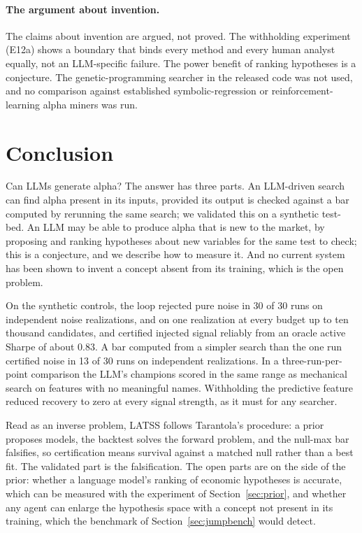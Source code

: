 \documentclass[11pt]{article}
\begin{document}
\paragraph{The argument about invention.} The claims about invention are argued, not proved. The
withholding experiment (E12a) shows a boundary that binds every method and every human analyst equally,
not an LLM-specific failure. The power benefit of ranking hypotheses is a conjecture. The
genetic-programming searcher in the released code was not used, and no comparison against established
symbolic-regression or reinforcement-learning alpha miners was run.

\section{Conclusion}

Can LLMs generate alpha? The answer has three parts. An LLM-driven search can find alpha present in its
inputs, provided its output is checked against a bar computed by rerunning the same search; we
validated this on a synthetic test-bed. An LLM may be able to produce alpha that is new to the market, by
proposing and ranking hypotheses about new variables for the same test to check; this is a conjecture,
and we describe how to measure it. And no current system has been shown to invent a concept absent from
its training, which is the open problem.

On the synthetic controls, the loop rejected pure noise in 30 of 30 runs on independent noise
realizations, and on one realization at every budget up to ten thousand candidates, and certified
injected signal reliably from an oracle active Sharpe of about 0.83. A bar computed from a simpler search
than the one run certified noise in 13 of 30 runs on independent realizations. In a three-run-per-point comparison the LLM's champions scored in the same range as mechanical
search on features with no meaningful names. Withholding the predictive feature reduced recovery to zero
at every signal strength, as it must for any searcher.

Read as an inverse problem, LATSS follows Tarantola's procedure: a prior proposes models, the backtest
solves the forward problem, and the null-max bar falsifies, so certification means survival against a
matched null rather than a best fit. The validated part is the falsification. The open parts are on the
side of the prior: whether a language model's ranking of economic hypotheses is accurate, which can be
measured with the experiment of Section~\ref{sec:prior}, and whether any agent can enlarge the hypothesis
space with a concept not present in its training, which the benchmark of Section~\ref{sec:jumpbench}
would detect.
\end{document}
